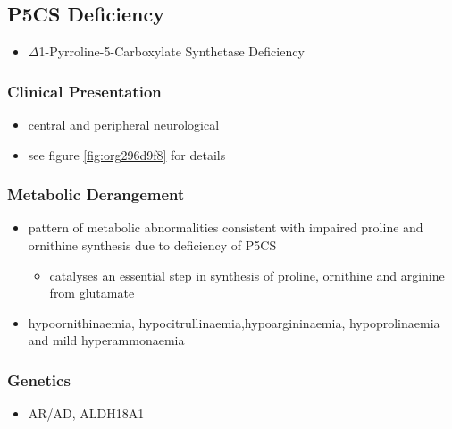 \documentclass{scrartcl}
\begin{document}
\subsection{P5CS  Deficiency}
\label{sec:orgc3ed9aa}
\begin{itemize}
\item \(\Delta\)1-Pyrroline-5-Carboxylate Synthetase Deficiency
\end{itemize}
\subsubsection{Clinical Presentation}
\label{sec:org1a1a6b1}
\begin{itemize}
\item central and peripheral neurological
\item see figure \ref{fig:org296d9f8} for details
\end{itemize}

\subsubsection{Metabolic Derangement}
\label{sec:org576cfbd}
\begin{itemize}
\item pattern of metabolic abnormalities consistent with impaired proline
and ornithine synthesis due to deficiency of P5CS
\begin{itemize}
\item catalyses an essential step in synthesis of proline, ornithine and
arginine from glutamate
\end{itemize}
\item hypoornithinaemia, hypocitrullinaemia,hypoargininaemia,
hypoprolinaemia and mild hyperammonaemia
\end{itemize}

\subsubsection{Genetics}
\label{sec:org54650d9}
\begin{itemize}
\item AR/AD, ALDH18A1
\end{itemize}
\end{document}
